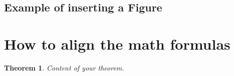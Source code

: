 \documentclass{aims}
\newtheorem{theorem}{Theorem}[section]
\theoremstyle{definition}
\begin{document}
\subsection{Example of inserting a Figure}



\section{How to align the math formulas}

\begin{theorem} \label{result2}
        Content of your theorem.
\end{theorem}
\end{document}
